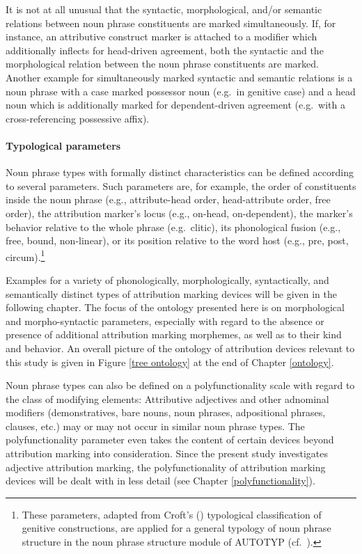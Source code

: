 It is not at all unusual that the syntactic, morphological, and/\-or semantic relations between noun phrase constituents are marked simultaneously. If, for instance, an attributive construct marker is attached to a modifier which additionally inflects for head-driven agreement, both the syntactic and the morphological relation between the noun phrase constituents are marked. Another example for simultaneously marked syntactic and semantic relations is a noun phrase with a case marked possessor noun (e.g.~in genitive case) and a head noun which is additionally marked for dependent-driven agreement (e.g.~with a cross-referencing possessive affix).

\paragraph{Typological parameters} Noun phrase types with formally distinct characteristics can be defined according to several parameters. Such parameters are, for example, the order of constituents inside the noun phrase (e.g., attribute-head order, head-attribute order, free order), the attribution marker's locus (e.g., on-head, on-dependent), the marker's behavior relative to the whole phrase (e.g.~clitic), its phonological fusion (e.g., free, bound, non-linear), or its position relative to the word host (e.g., pre, post, circum).\footnote{These parameters, adapted from Croft's (\citeyear[93–94]{croft1995}) typological classification of genitive constructions, are applied for a general typology of noun phrase structure in the noun phrase structure module of AUTOTYP (cf.~\citealt{AUTOTYP-NP}).}

Examples for a variety of phonologically, morphologically, syntactically, and semantically distinct types of attribution marking devices will be given in the following chapter. The focus of the ontology presented here is on morphological and morpho-syntactic parameters, especially with regard to the absence or presence of additional attribution marking morphemes, as well as to their kind and behavior. An overall picture of the ontology of attribution devices relevant to this study is given in Figure \ref{tree ontology} at the end of Chapter \ref{ontology}.

Noun phrase types can also be defined on a polyfunctionality scale with regard to the class of modifying elements: Attributive adjectives and other adnominal modifiers (demonstratives, bare nouns, noun phrases, adpositional phrases, clauses, etc.) may or may not occur in similar noun phrase types. The polyfunctionality parameter even takes the content of certain devices beyond attribution marking into consideration. Since the present study investigates adjective attribution marking, the polyfunctionality of attribution marking devices will be dealt with in less detail (see Chapter \ref{polyfunctionality}). 

